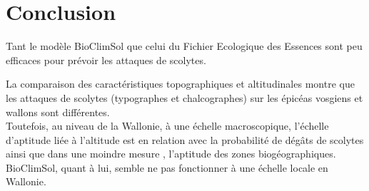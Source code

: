 \newpage
\section{Conclusion}

Tant le modèle BioClimSol que celui du Fichier Ecologique des Essences sont peu efficaces pour prévoir les attaques de scolytes.

La comparaison des caractéristiques topographiques et altitudinales montre que les attaques de scolytes (typographes et chalcographes) sur les épicéas vosgiens et wallons sont différentes.\\

Toutefois, au niveau de la Wallonie, à une échelle macroscopique, l'échelle d'aptitude liée à l'altitude est en relation avec la probabilité de dégâts de scolytes ainsi que dans une moindre mesure , l'aptitude des zones biogéographiques.\\

BioClimSol, quant à lui, semble ne pas fonctionner à une échelle locale en Wallonie.




